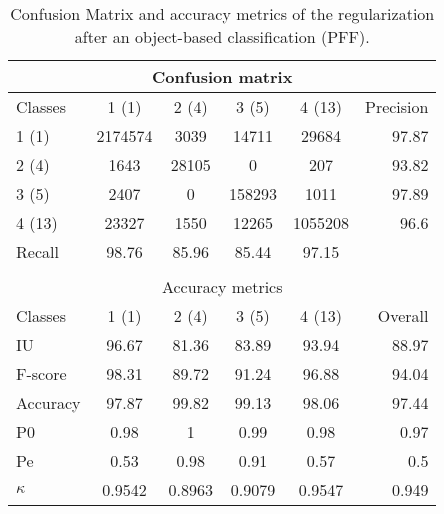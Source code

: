 \begin{table}[H]
\begin{center}
\footnotesize
\begin{tabular}{|l|c|c|c|c|r|}
\hline
\multicolumn{6}{|c|}{Confusion matrix} \\
\hline
 Classes & 1 (1) & 2 (4) & 3 (5) & 4 (13) & Precision \\
\hline
1 (1) & 2174574 & 3039 & 14711 & 29684 & 97.87 \\
\hline
2 (4) & 1643 & 28105 & 0 & 207 & 93.82 \\
\hline
3 (5) & 2407 & 0 & 158293 & 1011 & 97.89 \\
\hline
4 (13) & 23327 & 1550 & 12265 & 1055208 & 96.6 \\
\hline
Recall & 98.76 & 85.96 & 85.44 & 97.15 &  \\
\hline
\multicolumn{6}{c}{ } \\
\hline
\multicolumn{6}{|c|}{Accuracy metrics} \\
\hline
 Classes & 1 (1) & 2 (4) & 3 (5) & 4 (13) & Overall \\
\hline
IU & 96.67 & 81.36 & 83.89 & 93.94 & 88.97 \\
\hline
F-score & 98.31 & 89.72 & 91.24 & 96.88 & 94.04 \\
\hline
Accuracy & 97.87 & 99.82 & 99.13 & 98.06 & 97.44 \\
\hline
P0 & 0.98 & 1 & 0.99 & 0.98 & 0.97 \\
\hline
Pe & 0.53 & 0.98 & 0.91 & 0.57 & 0.5 \\
\hline
$\kappa$ & 0.9542 & 0.8963 & 0.9079 & 0.9547 & 0.949 \\
\hline
\end{tabular}
\caption{Confusion Matrix and accuracy metrics of the regularization after an object-based classification (PFF).}
\label{table:C3_S3_ss3_regul_PFF}
\end{center}
\end{table}
